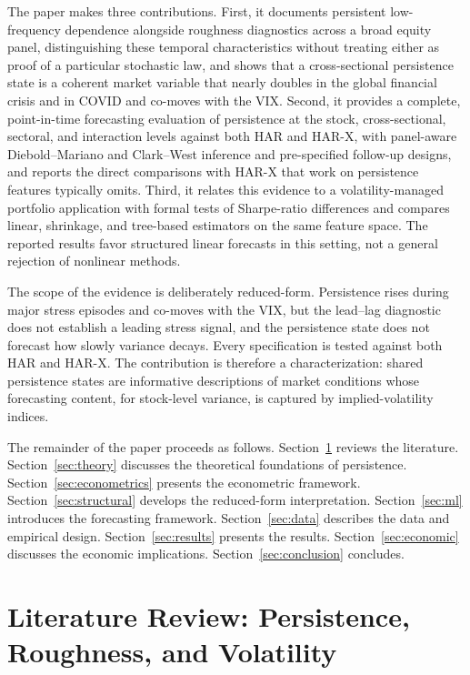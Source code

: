 \documentclass[jrfm,article,submit,moreauthors,pdftex]{Definitions/mdpi}
\begin{document}
The paper makes three contributions. First, it documents persistent
low-frequency dependence alongside roughness diagnostics across a broad
equity panel, distinguishing these temporal characteristics without treating
either as proof of a particular stochastic law, and shows that a
cross-sectional persistence state is a coherent market variable that nearly
doubles in the global financial crisis and in COVID and co-moves with the
VIX. Second, it provides a complete, point-in-time forecasting evaluation of
persistence at the stock, cross-sectional, sectoral, and interaction levels
against both HAR and HAR-X, with panel-aware Diebold--Mariano and
Clark--West inference and pre-specified follow-up designs, and reports the
direct comparisons with HAR-X that work on persistence features typically
omits. Third, it relates this evidence to a volatility-managed portfolio
application with formal tests of Sharpe-ratio differences and compares
linear, shrinkage, and tree-based estimators on the same feature space. The
reported results favor structured linear forecasts in this setting, not a
general rejection of nonlinear methods.

The scope of the evidence is deliberately reduced-form. Persistence rises
during major stress episodes and co-moves with the VIX, but the lead--lag
diagnostic does not establish a leading stress signal, and the persistence
state does not forecast how slowly variance decays. Every specification is
tested against both HAR and HAR-X. The contribution is therefore a
characterization: shared persistence states are informative descriptions
of market conditions whose forecasting content, for stock-level variance,
is captured by implied-volatility indices.

The remainder of the paper proceeds as follows. Section~\ref{sec:literature}
reviews the literature. Section~\ref{sec:theory} discusses the theoretical
foundations of persistence. Section~\ref{sec:econometrics} presents the
econometric framework. Section~\ref{sec:structural} develops the
reduced-form interpretation. Section~\ref{sec:ml} introduces the forecasting
framework. Section~\ref{sec:data} describes the data and empirical design.
Section~\ref{sec:results} presents the results. Section~\ref{sec:economic}
discusses the economic implications. Section~\ref{sec:conclusion} concludes.


\section{Literature Review: Persistence, Roughness, and Volatility}
\label{sec:literature}
\end{document}
